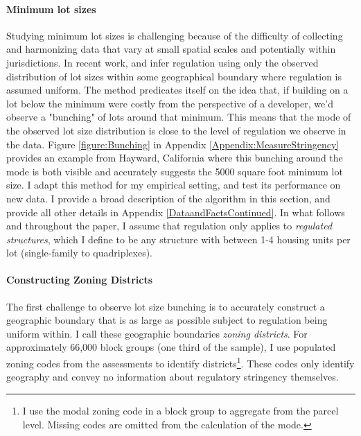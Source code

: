 \documentclass[12pt]{article}
\begin{document}
	 \paragraph*{Minimum lot sizes}
	 Studying minimum lot sizes is challenging because of the difficulty of collecting and harmonizing data that vary at small spatial scales and potentially within jurisdictions. In recent work, \cite{Song} and \cite{Cui} infer regulation using only the observed distribution of lot sizes within some geographical boundary where regulation is assumed uniform. The method predicates itself on the idea that, if building on a lot below the minimum were costly from the perspective of a developer, we'd observe a "bunching" of lots around that minimum. This means that the mode of the observed lot size distribution is close to the level of regulation we observe in the data. Figure \ref{figure:Bunching} in Appendix \ref{Appendix:MeasureStringency} provides an example from Hayward, California where this bunching around the mode is both visible and accurately suggests the 5000 square foot minimum lot size. I adapt this method for my empirical setting, and test its performance on new data. I provide a broad description of the algorithm in this section, and provide all other details in Appendix \ref{DataandFactsContinued}. In what follows and throughout the paper, I assume that regulation only applies to \textit{regulated structures}, which I define to be any structure with between 1-4 housing units per lot (single-family to quadriplexes).
	 
	 \paragraph*{Constructing Zoning Districts} The first challenge to observe lot size bunching is to accurately construct a geographic boundary that is as large as possible subject to regulation being uniform within. I call these geographic boundaries \textit{zoning districts}. For approximately 66,000 block groups (one third of the sample), I use populated zoning codes from the assessments to identify districts\footnote{I use the modal zoning code in a block group to aggregate from the parcel level. Missing codes are omitted from the calculation of the mode.}. These codes only identify geography and convey no information about regulatory stringency themselves. 
	 
\end{document}
